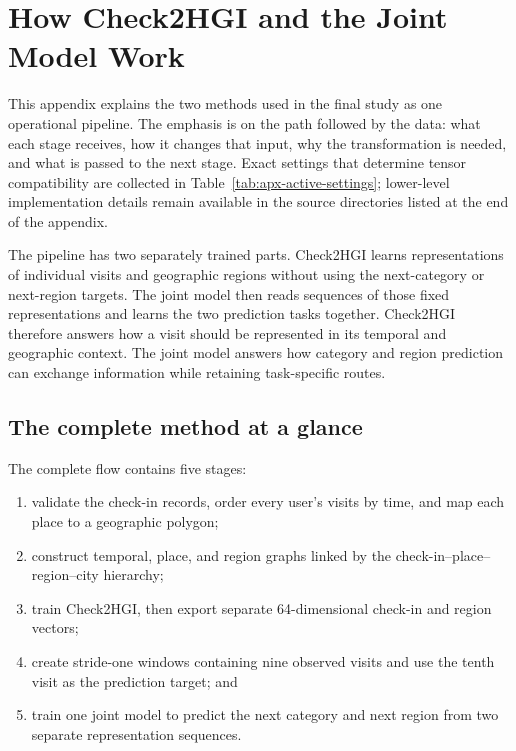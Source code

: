 \chapter{How Check2HGI and the Joint Model Work}
\label{apx:check2hgi-joint-model}

This appendix explains the two methods used in the final study as one operational
pipeline. The emphasis is on the path followed by the data: what each stage
receives, how it changes that input, why the transformation is needed, and what is
passed to the next stage. Exact settings that determine tensor compatibility are
collected in Table~\ref{tab:apx-active-settings}; lower-level implementation details
remain available in the source directories listed at the end of the appendix.

The pipeline has two separately trained parts. Check2HGI learns representations of
individual visits and geographic regions without using the next-category or
next-region targets. The joint model then reads sequences of those fixed
representations and learns the two prediction tasks together. Check2HGI therefore
answers how a visit should be represented in its temporal and geographic context.
The joint model answers how category and region prediction can exchange information
while retaining task-specific routes.

\section{The complete method at a glance}
\label{sec:apx-methods-pipeline}

The complete flow contains five stages:
\begin{enumerate}
    \item validate the check-in records, order every user's visits by time, and map
    each place to a geographic polygon;
    \item construct temporal, place, and region graphs linked by the
    check-in--place--region--city hierarchy;
    \item train Check2HGI, then export separate 64-dimensional check-in and region
    vectors;
    \item create stride-one windows containing nine observed visits and use the
    tenth visit as the prediction target; and
    \item train one joint model to predict the next category and next region from
    two separate representation sequences.
\end{enumerate}

